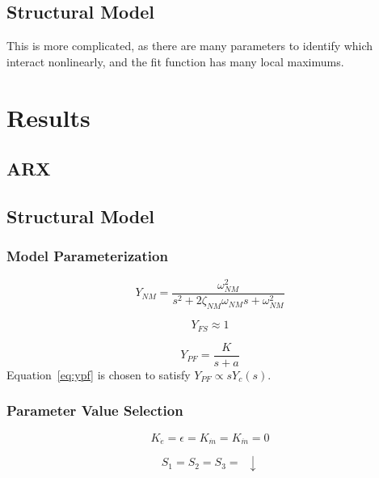 \subsection{Structural Model}
This is more complicated, as there are many parameters to identify which interact nonlinearly, and the fit function has many local maximums.

\section{Results}

\subsection{ARX}

\subsection{Structural Model}

\subsubsection{Model Parameterization}
\begin{equation}
    Y_{NM} = \frac{\omega^2_{NM}}{s^2 + 2 \zeta_{NM} \omega_{NM} s + \omega^2_{NM}}
\end{equation}

\begin{equation}
    Y_{FS} \approx 1
\end{equation}

\begin{equation} \label{eq:ypf}
    Y_{PF} = \frac{K}{s+a}
\end{equation}
Equation~\ref{eq:ypf} is chosen to satisfy $Y_{PF} \propto s Y_c (s)$.

\subsubsection{Parameter Value Selection}

\begin{equation}
    K_{\dot{e}} = \epsilon = K_{\dot{m}} = K_{\ddot{m}} = 0
\end{equation}

\begin{equation}
    S_1 = S_2 = S_3 = \enspace \downarrow
\end{equation}


